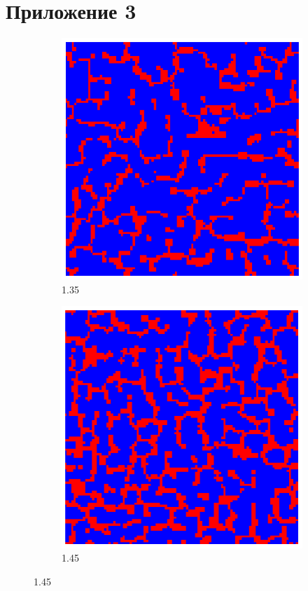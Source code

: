 \documentclass[a4paper]{article}
\begin{document}
\section{Приложение 3}
\begin{figure}[H]
	\begin{subfigure}{.5\textwidth}
		\includegraphics[width=.8\linewidth]{1.35-1.45-1.png}
		\caption{1.35}
	\end{subfigure}
	\begin{subfigure}{.5\textwidth}
		\includegraphics[width=.8\linewidth]{1.35-1.45-2.png}
		\caption{1.45}
	\end{subfigure}%


\end{figure}
\end{document}
